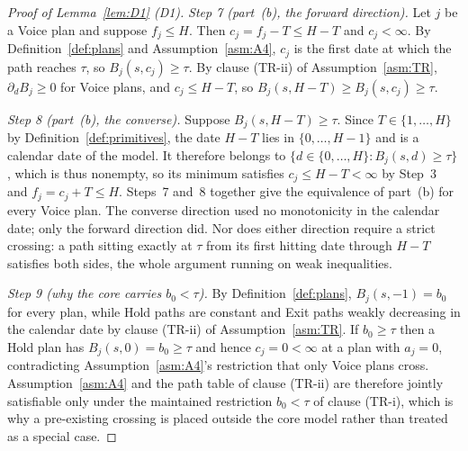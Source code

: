 \documentclass[11pt]{article}
\begin{document}
\begin{proof}[Proof of Lemma~\ref{lem:D1} (D1)]
\emph{Step 7 (part~(b), the forward direction).} Let $j$ be a Voice plan and suppose $f_j \le H$.
Then $c_j = f_j - T \le H-T$ and $c_j < \infty$. By Definition~\ref{def:plans} and
Assumption~\ref{asm:A4}, $c_j$ is the first date at which the path reaches $\tau$, so
$B_j(s,c_j) \ge \tau$. By clause (TR-ii) of Assumption~\ref{asm:TR}, $\partial_d B_j \ge 0$ for
Voice plans, and $c_j \le H-T$, so $B_j(s,H-T) \ge B_j(s,c_j) \ge \tau$.

\emph{Step 8 (part~(b), the converse).} Suppose $B_j(s,H-T) \ge \tau$. Since
$T \in \{1,\dots,H\}$ by Definition~\ref{def:primitives}, the date $H-T$ lies in $\{0,\dots,H-1\}$
and is a calendar date of the model. It therefore belongs to
$\{d \in \{0,\dots,H\} : B_j(s,d) \ge \tau\}$, which is thus nonempty, so its minimum satisfies
$c_j \le H-T < \infty$ by Step~3 and $f_j = c_j+T \le H$. Steps~7 and~8 together give the equivalence
of part~(b) for every Voice plan. The converse direction used no monotonicity in the calendar date;
only the forward direction did. Nor does either direction require a strict crossing: a path sitting
exactly at $\tau$ from its first hitting date through $H-T$ satisfies both sides, the whole argument
running on weak inequalities.

\emph{Step 9 (why the core carries $b_0 < \tau$).} By Definition~\ref{def:plans},
$B_j(s,-1) = b_0$ for every plan, while Hold paths are constant and Exit paths weakly decreasing in
the calendar date by clause (TR-ii) of Assumption~\ref{asm:TR}. If $b_0 \ge \tau$ then a Hold plan
has $B_j(s,0) = b_0 \ge \tau$ and hence $c_j = 0 < \infty$ at a plan with $a_j = 0$, contradicting
Assumption~\ref{asm:A4}'s restriction that only Voice plans cross. Assumption~\ref{asm:A4} and the
path table of clause (TR-ii) are therefore jointly satisfiable only under the maintained restriction
$b_0 < \tau$ of clause (TR-i), which is why a pre-existing crossing is placed outside the core model
rather than treated as a special case.


\end{proof}
\end{document}
